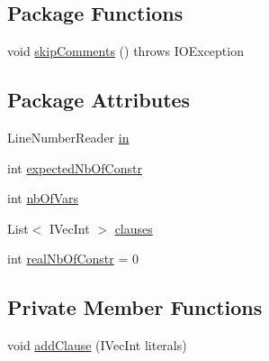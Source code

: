 \subsection*{Package Functions}
\begin{DoxyCompactItemize}
\item 
void \hyperlink{classedu_1_1pku_1_1id_1_1_cnf_file_reader_a15c13f0f5fedd82e750c3363669be660}{skipComments} ()  throws IOException 
\end{DoxyCompactItemize}
\subsection*{Package Attributes}
\begin{DoxyCompactItemize}
\item 
LineNumberReader \hyperlink{classedu_1_1pku_1_1id_1_1_cnf_file_reader_a3717ac54164ef0dfbecbae92b1aa72a1}{in}
\item 
int \hyperlink{classedu_1_1pku_1_1id_1_1_cnf_file_reader_ad3ed686a592eb84bf6867f7ddd56bd78}{expectedNbOfConstr}
\item 
int \hyperlink{classedu_1_1pku_1_1id_1_1_cnf_file_reader_a7f03ba75c5ce610188b2c1e37c944c36}{nbOfVars}
\item 
List$<$ IVecInt $>$ \hyperlink{classedu_1_1pku_1_1id_1_1_cnf_file_reader_aaa77e88b70b069ecc674f336d7875267}{clauses}
\item 
int \hyperlink{classedu_1_1pku_1_1id_1_1_cnf_file_reader_a16636d3c182e528b66818e5230ed40d1}{realNbOfConstr} = 0
\end{DoxyCompactItemize}
\subsection*{Private Member Functions}
\begin{DoxyCompactItemize}
\item 
void \hyperlink{classedu_1_1pku_1_1id_1_1_cnf_file_reader_a0eca53b2f0587ca43bd920c1eba08d05}{addClause} (IVecInt literals)
\end{DoxyCompactItemize}



